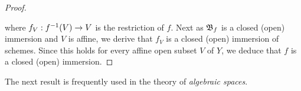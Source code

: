 \begin{proof}
\begin{center}
\end{center}
where $f_V:f^{-1}(V)\rightarrow V$ is the restriction of $f$. Next as ${\mathfrak B}_f$ is a closed (open) immersion and $V$ is affine, we derive that $f_V$ is a closed (open) immersion of schemes. Since this holds for every affine open subset $V$ of $Y$, we deduce that $f$ is a closed (open) immersion.
\end{proof}
\noindent
The next result is frequently used in the theory of \textit{algebraic spaces}.

